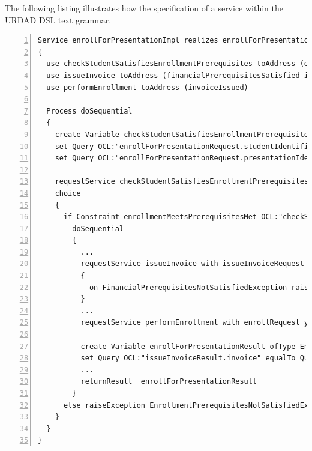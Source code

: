 The following listing illustrates how the specification of a service within the URDAD DSL text grammar.
\lstset{language=urdad,caption=Specifying a service in the textual URDAD DSL syntax.,label=serviceTextSyntax}
\begin{lstlisting}[numbers=left,escapechar=|]
Service enrollForPresentationImpl realizes enrollForPresentation receiving Variable enrollForPresentationRequest ofType EnrollForPresentationRequest
{
  use checkStudentSatisfiesEnrollmentPrerequisites toAddress (enrollmentPrerequisitesMet)
  use issueInvoice toAddress (financialPrerequisitesSatisfied invoiceIssued) 
  use performEnrollment toAddress (invoiceIssued)
   
  Process doSequential
  {
    create Variable checkStudentSatisfiesEnrollmentPrerequisitesRequest ofType CheckStudentSatisfiesEnrollmentPrerequisitesRequest               
    set Query OCL:"enrollForPresentationRequest.studentIdentifier" equalTo Query OCL:"checkEnrollmentPrerequisitesRequest.studentIdentifier"
    set Query OCL:"enrollForPresentationRequest.presentationIdentifier" equalTo Query OCL:"checkEnrollmentPrerequisitesRequest.presentationIdentifier"
                     
    requestService checkStudentSatisfiesEnrollmentPrerequisites with checkStudentSatisfiesEnrollmentPrerequisitesRequest yielding Variable checkStudentSatisfiesEnrollmentPrerequisitesResult ofType CheckStudentSatisfiesEnrollmentPrerequisitesResult
    choice
    {
      if Constraint enrollmentMeetsPrerequisitesMet OCL:"checkStudentSatisfiesEnrollmentPrerequisitesResult.enrollmentPrerequisitesMet = true"
        doSequential
        {
          ...
          requestService issueInvoice with issueInvoiceRequest yielding Variable issueInvoiceResult ofType IssueInvoiceResult
          {
            on FinancialPrerequisitesNotSatisfiedException raiseException FinancialPrerequisitesNotSatisfiedException
          }
	      ...
          requestService performEnrollment with enrollRequest yielding Variable performEnrollmentResult ofType PerformEnrollmentResult
          
          create Variable enrollForPresentationResult ofType EnrollForPresentationResult
          set Query OCL:"issueInvoiceResult.invoice" equalTo Query OCL:"enrollForPresentationResult.invoice"
          ...                       
          returnResult  enrollForPresentationResult
        }
      else raiseException EnrollmentPrerequisitesNotSatisfiedException
    }
  }
}                 
\end{lstlisting}


